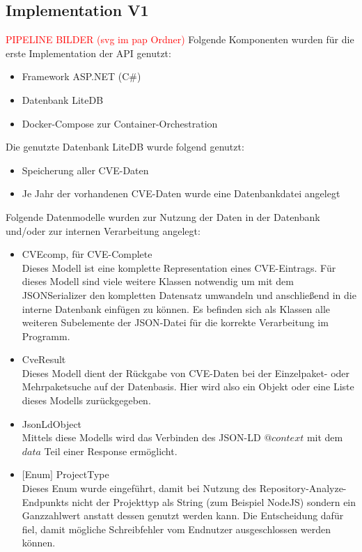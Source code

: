 \subsection{Implementation V1} \label{sec:Implementation1}
    \textcolor{red}{PIPELINE BILDER (svg im pap Ordner)}
    Folgende Komponenten wurden für die erste Implementation der \ac{API} genutzt:
    \begin{itemize}
        \item Framework ASP.NET (C\#)
        \item Datenbank LiteDB
        \item Docker-Compose zur Container-Orchestration
    \end{itemize}

    Die genutzte Datenbank LiteDB wurde folgend genutzt:
    \begin{itemize}
        \item Speicherung aller \ac{CVE}-Daten
        \item Je Jahr der vorhandenen \ac{CVE}-Daten wurde eine Datenbankdatei angelegt
    \end{itemize}

    Folgende Datenmodelle wurden zur Nutzung der Daten in der Datenbank und/oder zur internen Verarbeitung angelegt:
    \begin{itemize}
        \item CVEcomp, für CVE-Complete \\
            Dieses Modell ist eine komplette Representation eines \ac{CVE}-Eintrags.
            Für dieses Modell sind viele weitere Klassen notwendig um mit dem JSONSerializer den kompletten Datensatz umwandeln und anschließend in die interne Datenbank einfügen zu können.
            Es befinden sich als Klassen alle weiteren Subelemente der \ac{JSON}-Datei für die korrekte Verarbeitung im Programm.
        \item CveResult \\
            Dieses Modell dient der Rückgabe von \ac{CVE}-Daten bei der Einzelpaket- oder Mehrpaketsuche auf der Datenbasis.
            Hier wird also ein Objekt oder eine Liste dieses Modells zurückgegeben.
        \item JsonLdObject \\
            Mittels diese Modells wird das Verbinden des \ac{JSON-LD} \textit{$@context$} mit dem \textit{$data$} Teil einer Response ermöglicht.
        \item $[$Enum$]$ ProjectType \\
            Dieses Enum wurde eingeführt, damit bei Nutzung des Repository-Analyze-Endpunkts nicht der Projekttyp als String (zum Beispiel NodeJS) sondern ein Ganzzahlwert anstatt dessen genutzt werden kann.
            Die Entscheidung dafür fiel, damit mögliche Schreibfehler vom Endnutzer ausgeschlossen werden können.
    \end{itemize}

